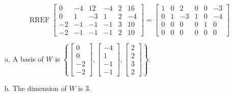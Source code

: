 \begin{exerciseAnswer} 


\[\operatorname{RREF} \left[\begin{array}{cccccc}
0 & -4 & 12 & -4 & 2 & 16 \\
0 & 1 & -3 & 1 & 2 & -4 \\
-2 & -1 & -1 & -1 & 3 & 10 \\
-2 & -1 & -1 & -1 & 2 & 10
\end{array}\right] = \left[\begin{array}{cccccc}
1 & 0 & 2 & 0 & 0 & -3 \\
0 & 1 & -3 & 1 & 0 & -4 \\
0 & 0 & 0 & 0 & 1 & 0 \\
0 & 0 & 0 & 0 & 0 & 0
\end{array}\right] \]


\begin{enumerate}[(a)]
\item A basis of \(W\) is \( \left\{ \left[\begin{array}{c}
0 \\
0 \\
-2 \\
-2
\end{array}\right] , \left[\begin{array}{c}
-4 \\
1 \\
-1 \\
-1
\end{array}\right] , \left[\begin{array}{c}
2 \\
2 \\
3 \\
2
\end{array}\right] \right\} \).
\item The dimension of \(W\) is \( 3 \).
\end{enumerate}
    
\end{exerciseAnswer}
    
